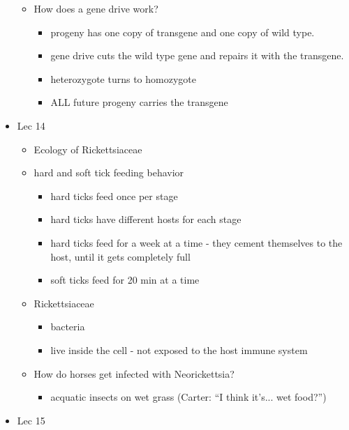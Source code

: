 \documentclass{article}
\begin{document}
\begin{itemize}
\begin{itemize}
\begin{itemize}
            \end{itemize}
            \item How does a gene drive work?
            \begin{itemize}
                \item progeny has one copy of transgene and one copy of wild type.
                \item gene drive cuts the wild type gene and repairs it with the transgene.
                \item heterozygote turns to homozygote
                \item ALL future progeny carries the transgene
            \end{itemize}
        \end{itemize}
        \item Lec 14
        \begin{itemize}
            \item Ecology of Rickettsiaceae
            \item hard and soft tick feeding behavior
            \begin{itemize}
                \item hard ticks feed once per stage
                \item hard ticks have different hosts for each stage
                \item hard ticks feed for a week at a time - they cement themselves to the host, until it gets completely full
                \item soft ticks feed for 20 min at a time
            \end{itemize}
            \item Rickettsiaceae
            \begin{itemize}
                \item bacteria
                \item live inside the cell - not exposed to the host immune system
            \end{itemize}
            \item How do horses get infected with Neorickettsia?
            \begin{itemize}
                \item acquatic insects on wet grass (Carter: ``I think it's... wet food?'')
            \end{itemize}
        \end{itemize}
        \item Lec 15

\end{itemize}
\end{document}
